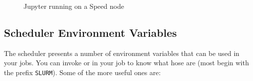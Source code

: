 \begin{figure}[htbp]
	\centering
	\caption{Jupyter running on a Speed node}
	\label{fig:jupyter}
\end{figure}

\subsection{Scheduler Environment Variables}
\label{sect:env-vars}

The scheduler presents a number of environment variables that can be used in 
your jobs. You can invoke  or  in your
job to know what hose are (most begin with the prefix \texttt{SLURM}).
%
Some of the more useful ones are:

